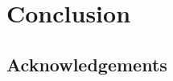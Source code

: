 \documentclass[11pt]{article}
\begin{document}

\section{Conclusion}
\label{sect.conclusion}

\subsection*{Acknowledgements}


{}
\end{document}

